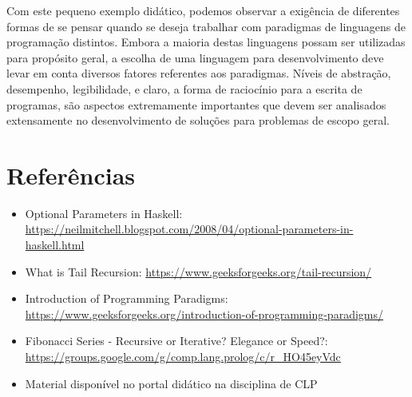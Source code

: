 \documentclass[a4paper, 12pt]{article}
\begin{document}
Com este pequeno exemplo didático, podemos observar a exigência de diferentes formas de se pensar quando se deseja trabalhar com paradigmas de linguagens de programação distintos. Embora a maioria destas linguagens possam ser utilizadas para propósito geral, a escolha de uma linguagem para desenvolvimento deve levar em conta diversos fatores referentes aos paradigmas. Níveis de abstração, desempenho, legibilidade, e claro, a forma de raciocínio para a escrita de programas, são aspectos extremamente importantes que devem ser analisados extensamente no desenvolvimento de soluções para problemas de escopo geral.

\section*{Referências}

\begin{itemize}
    \item Optional Parameters in Haskell: \url{https://neilmitchell.blogspot.com/2008/04/optional-parameters-in-haskell.html}
    \item What is Tail Recursion: \url{https://www.geeksforgeeks.org/tail-recursion/}
    \item Introduction of Programming Paradigms: \url{https://www.geeksforgeeks.org/introduction-of-programming-paradigms/}
    \item Fibonacci Series - Recursive or Iterative? Elegance or Speed?: \url{https://groups.google.com/g/comp.lang.prolog/c/r_HO45eyVdc}
    \item Material disponível no portal didático na disciplina de CLP
\end{itemize}
\end{document}
